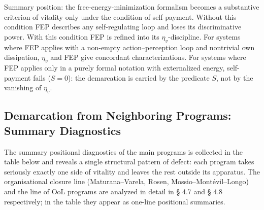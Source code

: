 \documentclass[pdflatex,sn-mathphys-ay]{sn-jnl}
\begin{document}
Summary position: the free-energy-minimization formalism becomes a substantive criterion of vitality only under the condition of self-payment. Without this condition FEP describes any self-regulating loop and loses its discriminative power. With this condition FEP is refined into its \(\eta_v\)-discipline. For systems where FEP applies with a non-empty action--perception loop and nontrivial own dissipation, \(\eta_v\) and FEP give concordant characterizations. For systems where FEP applies only in a purely formal notation with externalized energy, self-payment fails (\(S = 0\)): the demarcation is carried by the predicate \(S\), not by the vanishing of \(\eta_v\).

\subsection{Demarcation from Neighboring Programs: Summary Diagnostics}\label{demarcation-from-neighboring-programs-summary-diagnostics}

The summary positional diagnostics of the main programs is collected in the table below and reveals a single structural pattern of defect: each program takes seriously exactly one side of vitality and leaves the rest outside its apparatus. The organisational closure line (Maturana--Varela, Rosen, Mossio--Montévil--Longo) and the line of OoL programs are analyzed in detail in § 4.7 and § 4.8 respectively; in the table they appear as one-line positional summaries.
\end{document}
